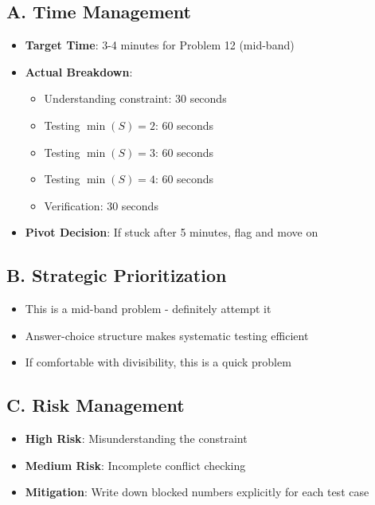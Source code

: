 \documentclass[12pt]{article}
\begin{document}
\begin{competitionbox}
\subsection*{A. Time Management}
\begin{itemize}[leftmargin=*]
    \item \textbf{Target Time}: 3-4 minutes for Problem 12 (mid-band)
    \item \textbf{Actual Breakdown}:
    \begin{itemize}
        \item Understanding constraint: 30 seconds
        \item Testing $\min(S) = 2$: 60 seconds
        \item Testing $\min(S) = 3$: 60 seconds
        \item Testing $\min(S) = 4$: 60 seconds
        \item Verification: 30 seconds
    \end{itemize}
    \item \textbf{Pivot Decision}: If stuck after 5 minutes, flag and move on
\end{itemize}

\subsection*{B. Strategic Prioritization}
\begin{itemize}[leftmargin=*]
    \item This is a mid-band problem - definitely attempt it
    \item Answer-choice structure makes systematic testing efficient
    \item If comfortable with divisibility, this is a quick problem
\end{itemize}

\subsection*{C. Risk Management}
\begin{itemize}[leftmargin=*]
    \item \textbf{High Risk}: Misunderstanding the constraint
    \item \textbf{Medium Risk}: Incomplete conflict checking
    \item \textbf{Mitigation}: Write down blocked numbers explicitly for each test case
\end{itemize}


\end{competitionbox}
\end{document}
